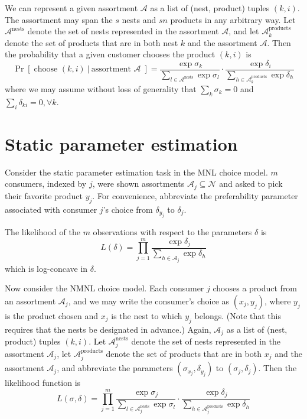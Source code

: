 \documentclass[preprint,12pt,authoryear]{elsarticle}
\begin{document}
We can represent a given assortment $\mathcal{A}$ as a list of (nest, product) tuples $(k, i)$. The assortment may span the $s$ nests and $sn$ products in any arbitrary way. Let $\mathcal{A}^{\text{nests}}$ denote the set of nests represented in the assortment $\mathcal{A}$, and let $\mathcal{A}_k^{\text{products}}$ denote the set of products that are in both nest $k$ and the assortment $\mathcal{A}$. Then the probability that a given customer chooses the product $(k, i)$ is
\begin{equation}\label{nmnlchoiceprobability}
\operatorname{Pr}\left[\;\text{choose } (k, i) ~|~\text{assortment }\mathcal{A}\;\right] =\frac{\exp \sigma_k}{\sum_{l\in \mathcal{A}^{\text{nests}}} \exp \sigma_l} \cdot \frac{\exp \delta_i}{\sum_{h\in\mathcal{A}_{k}^{\text{products}}} \exp \delta_h}\end{equation}
where we may assume without loss of generality that $\sum_k \sigma_k = 0$ and $\sum_i \delta_{ki} = 0, \forall k$. 

\section{Static parameter estimation}
Consider the static parameter estimation task in the MNL choice model. $m$ consumers, indexed by $j$, were shown assortments $\mathcal{A}_j \subseteq \mathcal{N}$ and asked to pick their favorite product $y_j$. For convenience, abbreviate the preferability parameter associated with consumer $j$'s choice from $\delta_{y_j}$ to $\delta_j$. 

The likelihood of the $m$ observations with respect to the parameters $\delta$ is
\begin{equation}
L(\delta) = \prod_{j=1}^m \frac{\exp \delta_j}{\sum_{h\in \mathcal{A}_j} \exp \delta_h}
\end{equation}
which is log-concave in $\delta$. 

Now consider the NMNL choice model. Each consumer $j$ chooses a product from an assortment $\mathcal{A}_j$, and we may write the consumer's choice as $(x_j, y_j)$, where $y_j$ is the product chosen and $x_j$ is the nest to which $y_j$ belongs. (Note that this requires that the nests be designated in advance.) Again, $\mathcal{A}_j$ as a list of (nest, product) tuples $(k, i)$. Let $\mathcal{A}_j^{\text{nests}}$ denote the set of nests represented in the assortment $\mathcal{A}_j$, let $\mathcal{A}_{j}^{\text{products}}$ denote the set of products that are in both $x_j$ and the assortment $\mathcal{A}_j$, and abbreviate the parameters $(\sigma_{x_j}, \delta_{y_j})$ to $(\sigma_j, \delta_j)$. Then the likelihood function is
\begin{equation}L(\sigma, \delta) = \prod_{j=1}^m \frac{\exp \sigma_j}{\sum_{l\in \mathcal{A}_j^{\text{nests}}} \exp \sigma_l} \cdot \frac{\exp \delta_j}{\sum_{h \in \mathcal{A}_{j}^{\text{products}}} \exp \delta_h}\end{equation}
\end{document}
